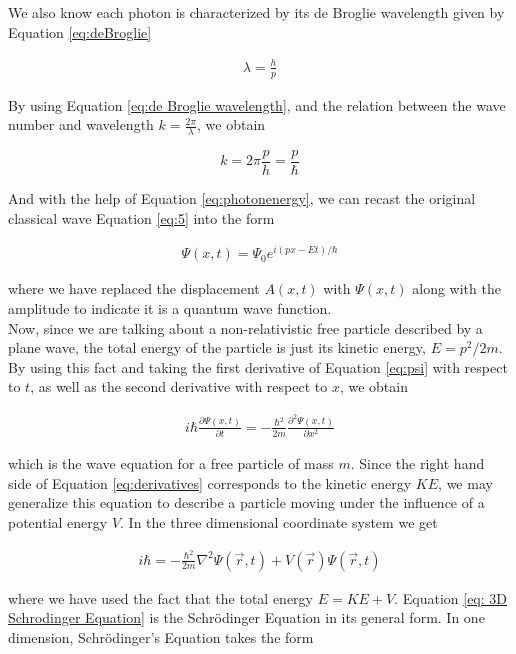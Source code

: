 We also know each photon is characterized by its de Broglie wavelength given by
Equation \ref{eq:deBroglie}

\begin{align} \label{eq:de Broglie wavelength}
  \lambda = \frac{h}{p}
\end{align}


By using Equation \ref{eq:de Broglie wavelength}, and the relation between the
wave number and wavelength $k = \frac{2\pi}{\lambda}$, we obtain 

\[
k = 2\pi \frac{p}{h} = \frac{p}{\hbar}
\] \vspace{3px}

And with the help of Equation \ref{eq:photonenergy}, we can recast the original
classical wave Equation \ref{eq:5} into the form 

\begin{align}\label{eq:psi}
  \Psi(x, t) = \Psi_0 e^{i(px - Et)/\hbar}
\end{align}

where we have replaced the displacement $A(x,t)$ with $\Psi(x, t)$ along with
the amplitude to indicate it is a quantum wave function. \\

Now, since we are talking about a non-relativistic free particle described by
a plane wave, the total energy of the particle is just its kinetic energy, $E
= p^2 / 2m$. By using this fact and taking the first derivative of Equation
\ref{eq:psi} with respect to $t$, as well as the second derivative with respect
to $x$, we obtain 

\begin{align} \label{eq:derivatives}
  i\hbar \frac{\partial \Psi(x, t)}{\partial t}  = -\frac{\hbar^2}{2m}
  \frac{\partial^2 \Psi(x, t)}{\partial x^2} 
\end{align}

which is the wave equation for a free particle of mass $m$. Since the right
hand side of Equation \ref{eq:derivatives} corresponds to the kinetic energy
$KE$, we may generalize this equation to describe a particle moving under the
influence of a potential energy $V$. In the three dimensional coordinate system
we get

\begin{align} \label{eq: 3D Schrodinger Equation}
  i\hbar = -\frac{\hbar^2}{2m} \nabla^2 \Psi(\vec{r}, t)
  + V(\vec{r})\Psi(\vec{r}, t)
\end{align}

where we have used the fact that the total energy $E = KE + V$. Equation
\ref{eq: 3D Schrodinger Equation} is the Schr\"odinger Equation in its general
form. In one dimension, Schr\"odinger's Equation takes the form 

